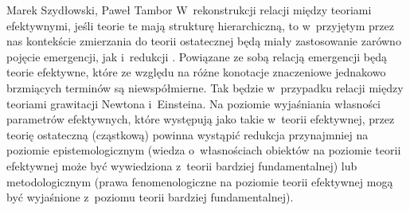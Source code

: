 \begin{artplenv2auth}{Marek Szydłowski, Paweł Tambor}
W~rekonstrukcji relacji między teoriami efektywnymi, jeśli teorie te mają strukturę hierarchiczną, to w~przyjętym przez nas kontekście zmierzania do teorii ostatecznej będą miały zastosowanie zarówno pojęcie emergencji, jak i~redukcji
\parencites[][]{butterfield_reduction_2014}[][]{castellani_reductionism_2002}[][]{bain_emergence_2013}. %
 Powiązane ze sobą relacją emergencji będą teorie efektywne, które ze względu na różne konotacje znaczeniowe jednakowo brzmiących terminów są niewspółmierne. Tak będzie w~przypadku relacji między teoriami grawitacji Newtona i~Einsteina. Na poziomie wyjaśniania własności parametrów efektywnych, które występują jako takie w~teorii efektywnej, przez teorię ostateczną (cząstkową) powinna wystąpić redukcja przynajmniej na poziomie epistemologicznym (wiedza o~własnościach obiektów na poziomie teorii efektywnej może być wywiedziona z~teorii bardziej fundamentalnej) lub metodologicznym (prawa fenomenologiczne na poziomie teorii efektywnej mogą być wyjaśnione z~poziomu teorii bardziej fundamentalnej).


\end{artplenv2auth}
